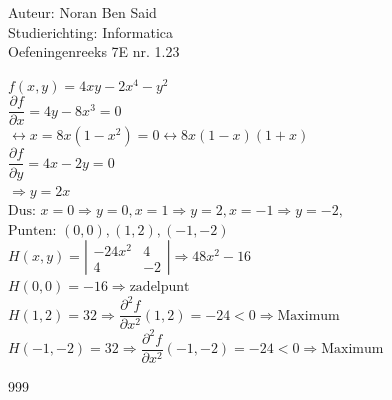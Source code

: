 \documentclass[a4paper]{article}
\begin{document}
  
\noindent \large Auteur: Noran Ben Said \\
\noindent \large Studierichting: Informatica\\
\noindent \large Oefeningenreeks 7E nr. 1.23\\

\medskip

\normalsize

$f(x,y) = 4xy -2x^4 - y^2$\\

$\dfrac{\partial f}{\partial x} = 4y - 8x^3 = 0$\\

$\leftrightarrow x = 8x\left(1-x^2\right) = 0\leftrightarrow 8x \left(1-x\right)\left(1+x\right)$\\

$\dfrac{\partial f}{\partial y} = 4x-2y = 0$\\

$\Rightarrow y = 2x $\\

$\text{Dus: } x = 0 \Rightarrow y=0,x = 1 \Rightarrow y=2,x = -1 \Rightarrow y=-2, $\\

$\text{Punten: } (0,0), (1,2), (-1,-2)$\\

$H(x,y) = 
\left|
\begin{array}{ccc}
-24x^2 & 4\\
4 & -2
\end{array}
\right|
\Rightarrow 48x^2 -16$\\

$H(0, 0) = -16 \Rightarrow \text{zadelpunt}$\\

$H(1, 2) = 32 \Rightarrow \dfrac{\partial^2 f}{\partial x^2}(1,2) = -24 < 0 \Rightarrow \text{Maximum}$\\

$H(-1, -2) = 32 \Rightarrow \dfrac{\partial^2 f}{\partial x^2}(-1,-2) = -24 < 0 \Rightarrow \text{Maximum}$\\

\begin{thebibliography}{999}
\end{thebibliography}
\end{document}
